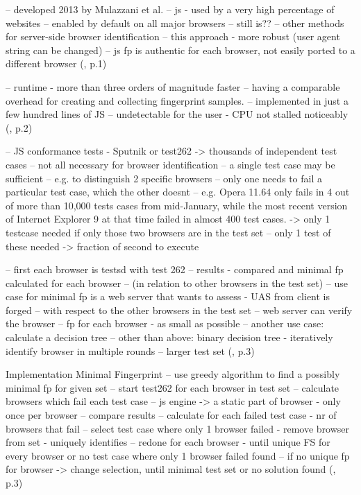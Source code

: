 -- developed 2013 by Mulazzani et al.
-- js - used by a very high percentage of websites
-- enabled by default on all major browsers -- still is??
-- other methods for server-side browser identification
-- this approach - more robust (user agent string can be changed)
-- js fp is authentic for each browser, not easily ported to a different browser
(\textcite{mulazzani13}, p.1)

-- runtime - more than three orders of magnitude faster
--  having a comparable overhead for creating and collecting fingerprint samples.
-- implemented in just a few hundred lines of JS
-- undetectable for the user - CPU not stalled noticeably
(\textcite{mulazzani13}, p.2)

-- JS conformance tests - Sputnik or test262 -> thousands of independent test cases
-- not all necessary for browser identification
-- a single test case may be sufficient
-- e.g. to distinguish 2 specific browsers 
-- only one needs to fail a particular test case, which the other doesnt
-- e.g.  Opera 11.64 only fails in 4 out of more than 10,000
tests cases from mid-January, while the most recent version
of Internet Explorer 9 at that time failed in almost 400 test
cases. -> only 1 testcase needed if only those two browsers are in the test set
-- only 1 test of these needed -> fraction of second to execute

-- first each browser is testsd with test 262
-- results - compared and minimal fp calculated for each browser
-- (in relation to other browsers in the test set)
-- use case for minimal fp is a web server that wants to assess - UAS from client is forged
-- with respect to the other browsers in the test set
-- web server can verify the browser
-- fp for each browser - as small as possible
-- another use case: calculate a decision tree
-- other than above: binary decision tree - iteratively identify browser in multiple rounds
-- larger test set
(\textcite{mulazzani13}, p.3)


Implementation Minimal Fingerprint
-- use greedy algorithm to find a possibly minimal fp for given set
-- start test262 for each browser in test set
-- calculate browsers which fail each test case
-- js engine -> a static part of browser - only once per browser
-- compare results 
-- calculate for each failed test case - nr of browsers that fail
-- select test case where only 1 browser failed - remove browser from set - uniquely identifies
-- redone for each browser - until unique FS for every browser or no test case where only 1 browser failed found
-- if no unique fp for browser -> change selection, until minimal test set or no solution found
(\textcite{mulazzani13}, p.3)

